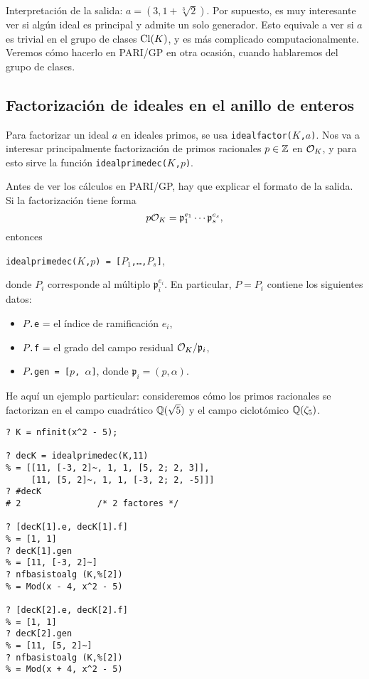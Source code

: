 Interpretación de la salida: $a = (3, 1 + \sqrt[3]{2})$. Por supuesto, es muy
interesante ver si algún ideal es principal y admite un solo generador.
Esto equivale a ver si $a$ es trivial en el grupo de clases $\operatorname{Cl} (K)$,
y es más complicado computacionalmente. Veremos cómo hacerlo en PARI/GP
en otra ocasión, cuando hablaremos del grupo de clases.


\subsection{Factorización de ideales en el anillo de enteros}

Para factorizar un ideal $a$ en ideales primos, se usa
\texttt{idealfactor($K$,$a$)}. Nos va a interesar principalmente factorización
de primos racionales $p \in \mathbb{Z}$ en $\mathcal{O}_K$, y para esto sirve la función
\texttt{idealprimedec($K$,$p$)}.

Antes de ver los cálculos en PARI/GP, hay que explicar el formato de la salida.
Si la factorización tiene forma
$$p\mathcal{O}_K = \mathfrak{p}_1^{e_1} \cdots \mathfrak{p}_s^{e_s},$$
entonces
\begin{center}
\texttt{idealprimedec($K$,$p$) = [$P_1$,\ldots,$P_s$]},
\end{center}
donde $P_i$ corresponde al múltiplo $\mathfrak{p}_i^{e_i}$. En particular,
$P = P_i$ contiene los siguientes datos:
\begin{itemize}
\item \texttt{$P$.e} = el índice de ramificación $e_i$,

\item \texttt{$P$.f} = el grado del campo residual $\mathcal{O}_K/\mathfrak{p}_i$,

\item \texttt{$P$.gen = [$p$, $\alpha$]}, donde $\mathfrak{p}_i = (p,\alpha)$.
\end{itemize}

He aquí un ejemplo particular: consideremos cómo los primos racionales se
factorizan en el campo cuadrático $\mathbb{Q} (\sqrt{5})$ y el campo ciclotómico
$\mathbb{Q} (\zeta_5)$.

\begin{shaded}
\begin{verbatim}
? K = nfinit(x^2 - 5);

? decK = idealprimedec(K,11)
% = [[11, [-3, 2]~, 1, 1, [5, 2; 2, 3]],
     [11, [5, 2]~, 1, 1, [-3, 2; 2, -5]]]
? #decK
# 2               /* 2 factores */

? [decK[1].e, decK[1].f]
% = [1, 1]
? decK[1].gen
% = [11, [-3, 2]~]
? nfbasistoalg (K,%[2])
% = Mod(x - 4, x^2 - 5)

? [decK[2].e, decK[2].f]
% = [1, 1]
? decK[2].gen
% = [11, [5, 2]~]
? nfbasistoalg (K,%[2])
% = Mod(x + 4, x^2 - 5)
\end{verbatim}
\end{shaded}

